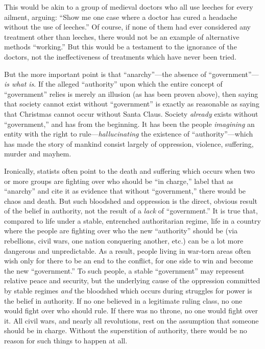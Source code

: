 \documentclass{book}
\begin{document}
This would be akin to a group of medieval doctors who all use leeches for every ailment, arguing: \enquote{Show me one case where a doctor has cured a headache without the use of leeches.} Of course, if none of them had ever considered any treatment other than leeches, there would not be an example of alternative methods \enquote{working.} But this would be a testament to the ignorance of the doctors, not the ineffectiveness of treatments which have never been tried.

But the more important point is that \enquote{anarchy}---the absence of \enquote{government}---\emph{is what is}. If the alleged \enquote{authority} upon which the entire concept of \enquote{government} relies is merely an illusion (as has been proven above), then saying that society cannot exist without \enquote{government} is exactly as reasonable as saying that Christmas cannot occur without Santa Claus. Society \emph{already} exists without \enquote{government,} and has from the beginning. It has been the people \emph{imagining} an entity with the right to rule---\emph{hallucinating} the existence of \enquote{authority}---which has made the story of mankind consist largely of oppression, violence, suffering, murder and mayhem.

Ironically, statists often point to the death and suffering which occurs when two or more groups are fighting over who should be \enquote{in charge,} label that as \enquote{anarchy} and cite it as evidence that without \enquote{government,} there would be chaos and death. But such bloodshed and oppression is the direct, obvious result of the belief in authority, not the result of a \emph{lack} of \enquote{government.} It is true that, compared to life under a stable, entrenched authoritarian regime, life in a country where the people are fighting over who the new \enquote{authority} should be (via rebellions, civil wars, one nation conquering another, etc.) can be a lot more dangerous and unpredictable. As a result, people living in war-torn areas often wish only for there to be an end to the conflict, for one side to win and become the new \enquote{government.} To such people, a stable \enquote{government} may represent relative peace and security, but the underlying cause of the oppression committed by stable regimes \emph{and} the bloodshed which occurs during struggles for power is the belief in authority. If no one believed in a legitimate ruling class, no one would fight over who should rule. If there was no throne, no one would fight over it. All civil wars, and nearly all revolutions, rest on the assumption that someone should be in charge. Without the superstition of authority, there would be no reason for such things to happen at all.
\end{document}
